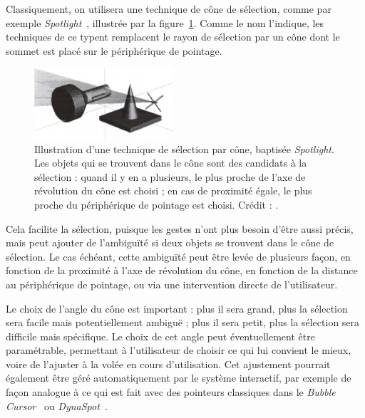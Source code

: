 	Classiquement, on utilisera une technique de cône de sélection, comme par exemple \emph{Spotlight}~\cite{liang1994jdcad}, illustrée par la figure~\ref{fig:spotlight}. Comme le nom l'indique, les techniques de ce typent remplacent le rayon de sélection par un cône dont le sommet est placé sur le périphérique de pointage.
	
	\begin{figure} %
		\centering
		\includegraphics[width=0.46\textwidth]{figures/ch2/spotlight}
		\caption[Cône de sélection : \emph{Spotlight}]{Illustration d'une technique de sélection par cône, baptisée \emph{Spotlight}. Les objets qui se trouvent dans le cône sont des candidats à la sélection : quand il y en a plusieurs, le plus proche de l'axe de révolution du cône est choisi ; en cas de proximité égale, le plus proche du périphérique de pointage est choisi. Crédit : \cite{liang1994jdcad}.}
		\label{fig:spotlight}
	\end{figure}
	
	Cela facilite la sélection, puisque les gestes n'ont plus besoin d'être aussi précis, mais peut ajouter de l'ambiguïté si deux objets se trouvent dans le cône de sélection. Le cas échéant, cette ambiguïté peut être levée de plusieurs façon, en fonction de la proximité à l'axe de révolution du cône, en fonction de la distance au périphérique de pointage, ou via une intervention directe de l'utilisateur.
	
	Le choix de l'angle du cône est important : plus il sera grand, plus la sélection sera facile mais potentiellement ambiguë ; plus il sera petit, plus la sélection sera difficile mais spécifique. Le choix de cet angle peut éventuellement être paramétrable, permettant à l'utilisateur de choisir ce qui lui convient le mieux, voire de l'ajuster à la volée en cours d'utilisation. Cet ajustement pourrait également être géré automatiquement par le système interactif, par exemple de façon analogue à ce qui est fait avec des pointeurs classiques dans le \emph{Bubble Cursor}~\cite{grossman2005bubble} ou \emph{DynaSpot}~\cite{chapuis2009dynaspot}.
	
